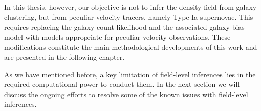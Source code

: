 In this thesis, however, our objective is not to infer the density field from galaxy clustering, but from peculiar velocity tracers, namely Type Ia supernovae. 
This requires replacing the galaxy count likelihood and the associated galaxy bias model with models appropriate for peculiar velocity observations. 
These modifications constitute the main methodological developments of this work and are presented in the following chapter.

As we have mentioned before, a key limitation of field-level inferences lies in the required computational 
power to conduct them. In the next section we will discuss the ongoing efforts to resolve some of the known issues with field-level inferences.